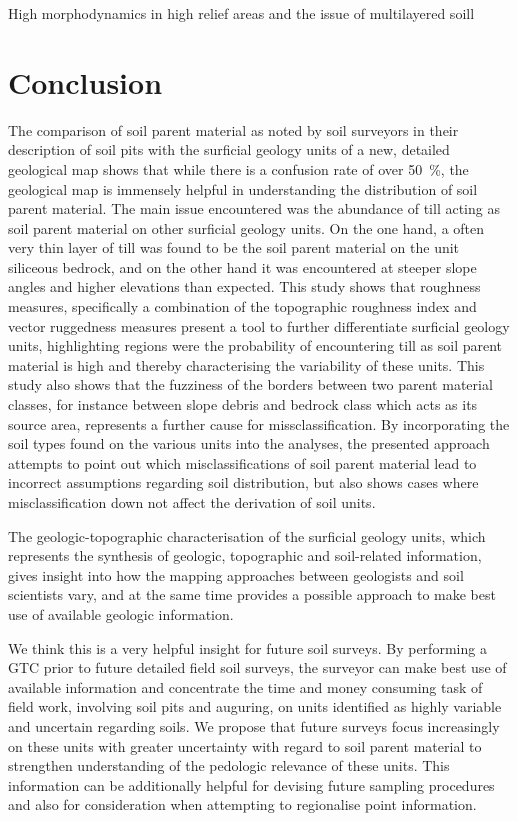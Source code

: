 \documentclass[preprint,12pt,authoryear]{elsarticle}
\begin{document}
High morphodynamics in high relief areas and the issue of  multilayered soill



\section{Conclusion}
The comparison of soil parent material as noted by soil surveyors in their description of soil pits  with the surficial geology units of a new, detailed geological map shows that while there is a confusion rate of over 50~\%, the geological map is immensely helpful in understanding the distribution of soil parent material. The main issue encountered was the abundance of till acting as soil parent material on other surficial geology units. On the one hand, a often very thin layer of till was found to be the soil parent material on the unit siliceous bedrock, and on the other hand it was encountered  at steeper slope angles and higher elevations than expected. This study shows that roughness measures, specifically a combination of the topographic roughness index and  vector ruggedness measures present a tool to further differentiate surficial geology units, highlighting regions were the probability of encountering till as soil parent material is high and thereby characterising the variability of these units. This study also shows that the fuzziness of the borders between two parent material classes, for instance between slope debris and bedrock class which acts as its source area, represents a further cause for missclassification. By incorporating the soil types found on the various units into the analyses, the presented approach attempts to point out which misclassifications of soil parent material lead to incorrect assumptions regarding soil distribution, but also shows cases where misclassification down not affect the derivation of soil units. 

The geologic-topographic characterisation of the surficial geology units, which represents the synthesis of geologic, topographic and soil-related information, gives insight into how the mapping approaches between geologists and soil scientists vary, and at the same time provides a possible approach to make best use of available geologic information.

 We think this is a very helpful insight for future soil surveys. 
By performing a GTC prior to future detailed field soil surveys, the surveyor can make best use of available information and concentrate the time and money consuming task of field work, involving soil pits and auguring, on units identified as highly variable and uncertain regarding soils. We propose that future surveys focus increasingly on these units with greater uncertainty with regard to soil parent material to strengthen understanding of the pedologic relevance of these units. This information can be additionally helpful for devising future sampling procedures and also for consideration when attempting to regionalise point information.
\end{document}
